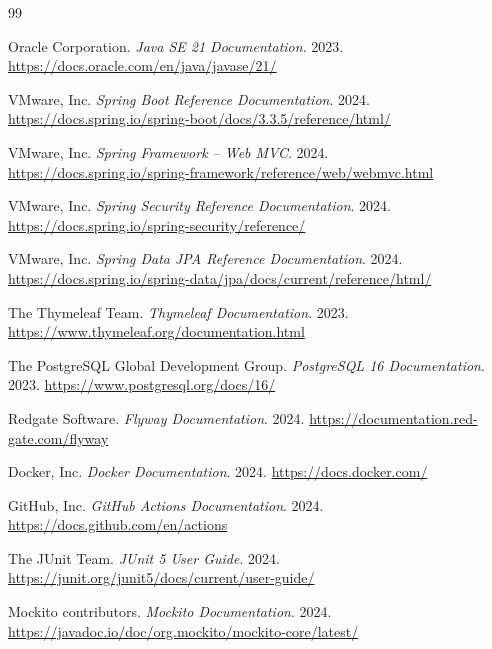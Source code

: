\documentclass[12pt, a4paper]{report}
\begin{document}
\begin{thebibliography}{99}

    Oracle Corporation.
    \textit{Java SE 21 Documentation}.
    2023.
    \url{https://docs.oracle.com/en/java/javase/21/}

    VMware, Inc.
    \textit{Spring Boot Reference Documentation}.
    2024.
    \url{https://docs.spring.io/spring-boot/docs/3.3.5/reference/html/}

    VMware, Inc.
    \textit{Spring Framework -- Web MVC}.
    2024.
    \url{https://docs.spring.io/spring-framework/reference/web/webmvc.html}

    VMware, Inc.
    \textit{Spring Security Reference Documentation}.
    2024.
    \url{https://docs.spring.io/spring-security/reference/}

    VMware, Inc.
    \textit{Spring Data JPA Reference Documentation}.
    2024.
    \url{https://docs.spring.io/spring-data/jpa/docs/current/reference/html/}

    The Thymeleaf Team.
    \textit{Thymeleaf Documentation}.
    2023.
    \url{https://www.thymeleaf.org/documentation.html}

    The PostgreSQL Global Development Group.
    \textit{PostgreSQL 16 Documentation}.
    2023.
    \url{https://www.postgresql.org/docs/16/}

    Redgate Software.
    \textit{Flyway Documentation}.
    2024.
    \url{https://documentation.red-gate.com/flyway}

    Docker, Inc.
    \textit{Docker Documentation}.
    2024.
    \url{https://docs.docker.com/}

    GitHub, Inc.
    \textit{GitHub Actions Documentation}.
    2024.
    \url{https://docs.github.com/en/actions}

    The JUnit Team.
    \textit{JUnit 5 User Guide}.
    2024.
    \url{https://junit.org/junit5/docs/current/user-guide/}

    Mockito contributors.
    \textit{Mockito Documentation}.
    2024.
    \url{https://javadoc.io/doc/org.mockito/mockito-core/latest/}


\end{thebibliography}
\end{document}
